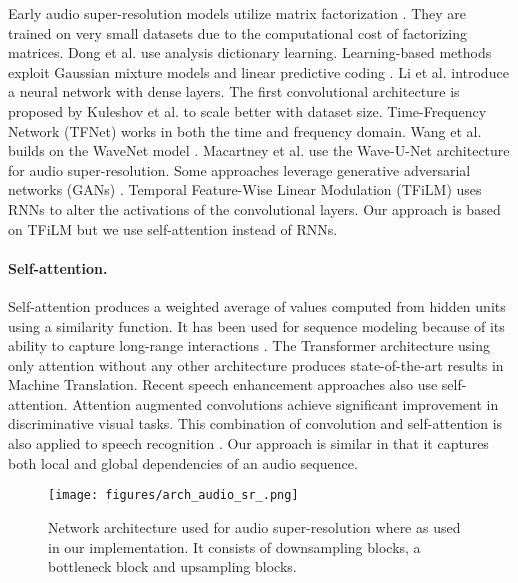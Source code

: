\documentclass{article}
\begin{document}
Early audio super-resolution models utilize matrix factorization \cite{bansal2005bandwidth,liang2013beta}. They are trained on very small datasets due to the computational cost of factorizing matrices. Dong et al. \cite{dong2015audio} use analysis dictionary learning. Learning-based methods exploit Gaussian mixture models \cite{cheng1994statistical,pulakka2011speech,park2000narrowband} and linear predictive coding \cite{bradbury2000linear}. Li et al. \cite{li2015dnn} introduce a neural network with dense layers. The first convolutional architecture is proposed by Kuleshov et al. \cite{kuleshov2017audio} to scale better with dataset size. Time-Frequency Network (TFNet) \cite{8462049} works in both the time and frequency domain. Wang et al.\cite{wang2018speech} builds on the WaveNet model \cite{oord2016wavenet}. Macartney et al. \cite{stoller2018wave} use the  Wave-U-Net  \cite{macartney2018improved} architecture for audio super-resolution. Some approaches \cite{eskimez2019speech,hu2020phase,li2018speech,li2019speech,kumar2020nu} leverage  generative adversarial networks (GANs) \cite{goodfellow2014generative}. Temporal Feature-Wise Linear Modulation (TFiLM) \cite{birnbaum2019temporal} uses RNNs to alter the activations of the convolutional layers. Our approach is based on TFiLM but we use self-attention instead of RNNs.

\paragraph*{Self-attention.}
Self-attention produces a weighted average of values computed from hidden units using a similarity function. It has been used for sequence modeling because of its ability to capture long-range interactions \cite{bahdanau2014neural, bello2016neural}. The Transformer architecture \cite{vaswani2017attention} using only attention without any other architecture produces state-of-the-art results in Machine Translation. Recent speech enhancement approaches \cite{koizumi2020speech,hao2019attention,giri2019attention} also use self-attention. Attention augmented convolutions \cite{bello2019attention} achieve significant improvement in discriminative visual tasks. This combination of convolution and
self-attention is also applied to speech recognition \cite{gulati2020conformer}. Our approach is similar in that it captures both local and global dependencies of an audio sequence.

\begin{figure}[htb]
    \centering
    \texttt{[image: figures/arch\_audio\_sr\_.png]}
    \caption{Network architecture used for audio super-resolution where  as used in our implementation. It consists of downsampling blocks, a bottleneck block and upsampling blocks.}
    \label{fig:arch}
\end{figure}
\end{document}
